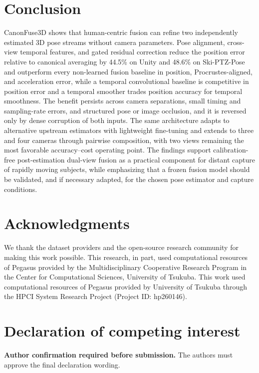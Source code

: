 \documentclass[preprint,12pt]{elsarticle}
\providecommand{\DIFaddbegin}{} %
\providecommand{\DIFaddend}{} %
\providecommand{\DIFadd}[1]{{\protect\color{blue}#1}} %
\begin{document}
\section{Conclusion}
\label{sec:conclusion}

CanonFuse3D shows that human-centric fusion can refine two independently estimated 3D pose streams without camera parameters. Pose alignment, cross-view temporal features, and gated residual correction  \DIFaddbegin \DIFadd{reduce the position error relative to canonical averaging by 44.5\% on Unity and 48.6\% on Ski-PTZ-Pose and outperform every non-learned fusion baseline in position, Procrustes-aligned, and acceleration error, while a temporal convolutional baseline is competitive in position error and a temporal smoother trades position accuracy for temporal smoothness}\DIFaddend . The benefit  \DIFaddbegin \DIFadd{persists across camera separations, small timing and sampling-rate errors, and structured pose or image occlusion, and it is reversed only by dense corruption of both inputs. The same architecture adapts to alternative upstream estimators with lightweight fine-tuning and extends to three and four cameras through pairwise composition, with two views remaining the most favorable accuracy--cost operating point. The }\DIFaddend findings support calibration-free post-estimation dual-view  \DIFaddbegin \DIFadd{fusion as a practical component for distant capture of rapidly moving subjects}\DIFaddend , while emphasizing  \DIFaddbegin \DIFadd{that a frozen fusion model should be validated, and if necessary adapted, for }\DIFaddend the chosen pose estimator and capture conditions.

\section*{Acknowledgments}
We thank the dataset providers and the open-source research community for making this work possible. This research, in part, used computational resources of Pegasus provided by the Multidisciplinary Cooperative Research Program in the Center for Computational Sciences, University of Tsukuba. This work used computational resources of Pegasus provided by University of Tsukuba through the HPCI System Research Project (Project ID: hp260146).

\section*{Declaration of competing interest}
\textbf{Author confirmation required before submission.} The authors must approve the final declaration wording.
\end{document}
